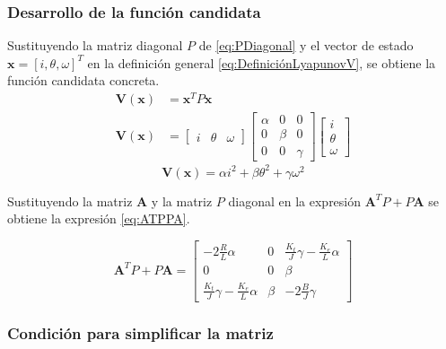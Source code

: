 \subsubsection{Desarrollo de la función candidata}
Sustituyendo la matriz diagonal $P$ de \eqref{eq:PDiagonal} y el vector de estado $\mathbf{x} = [i, \theta, \omega]^T$ en la definición general \eqref{eq:DefiniciónLyapunovV}, se obtiene la función candidata concreta.
\begin{equation*}
    \begin{aligned}
        \mathbf{V}(\mathbf{x}) &= \mathbf{x}^T P \mathbf{x}\\
        \mathbf{V}(\mathbf{x}) &=
        \begin{bmatrix}
            i & \theta & \omega
        \end{bmatrix}
        \begin{bmatrix}
            \alpha & 0 & 0 \\
            0 & \beta & 0 \\
            0 & 0 & \gamma
        \end{bmatrix}
        \begin{bmatrix}
            i \\ \theta \\ \omega
        \end{bmatrix}
    \end{aligned}
\end{equation*}
\begin{equation}
        \mathbf{V}(\mathbf{x}) =
        \alpha i^2 + \beta \theta^2 + \gamma \omega^2
        \label{eq:LyapunovCandidata}
\end{equation}

Sustituyendo la matriz $\mathbf{A}$ y la matriz $P$ diagonal en la expresión $\mathbf{A}^T P + P \mathbf{A}$ se obtiene la expresión \eqref{eq:ATPPA}.

\begin{equation}
    \mathbf{A}^T P + P \mathbf{A} = 
    \begin{bmatrix} 
        -2\frac{R}{L}\alpha & 0 & \frac{K_t}{J}\gamma - \frac{K_e}{L}\alpha \\
        0 & 0 & \beta \\
        \frac{K_t}{J}\gamma - \frac{K_e}{L}\alpha & \beta & -2\frac{B}{J}\gamma
    \end{bmatrix}
    \label{eq:ATPPA}
\end{equation}

\subsubsection{Condición para simplificar la matriz}

